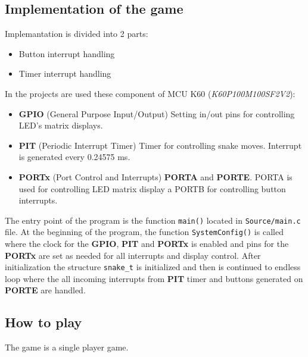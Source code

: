 \documentclass[a4paper, 11pt]{article}
\begin{document}

    \subsection{Implementation of the game}\label{subsec:implementation-of-the-game}
    Implemantation is divided into 2 parts:
    \begin{itemize}
        \item Button interrupt handling
        \item Timer interrupt handling
    \end{itemize}

    {\parindent 0pt In the projects are used these component of
    MCU K60 (\textit{K60P100M100SF2V2}):}
    \begin{itemize}
        \item \textbf{GPIO} (General Purpose Input/Output) \-
        Setting in/out pins for controlling LED's matrix displays.
        \item \textbf{PIT} (Periodic Interrupt Timer) \-
        Timer for controlling snake moves.
        Interrupt is generated every 0.24575 ms.
        \item \textbf{PORTx} (Port Control and Interrupts) \- \textbf{PORTA} and \textbf{PORTE}.
        PORTA is used for controlling LED matrix display a PORTB
        for controlling button interrupts.
    \end{itemize}

    The entry point of the program is the function \texttt{main()} located in
    \texttt{Source/main.c} file.
    At the beginning of the program, the function \texttt{SystemConfig()} is called
    where the clock for the \textbf{GPIO}, \textbf{PIT} and \textbf{PORTx} is enabled
    and pins for the \textbf{PORTx} are set as needed for all interrupts and display
    control.
    After initialization the structure \texttt{snake\_t} is initialized and then
    is continued to endless loop where the all incoming interrupts
    from \textbf{PIT} timer and buttons generated on \textbf{PORTE} are handled.



    \subsection{How to play}\label{subsec:functionality-of-the-game}
    The game is a single player game.

\end{document}
